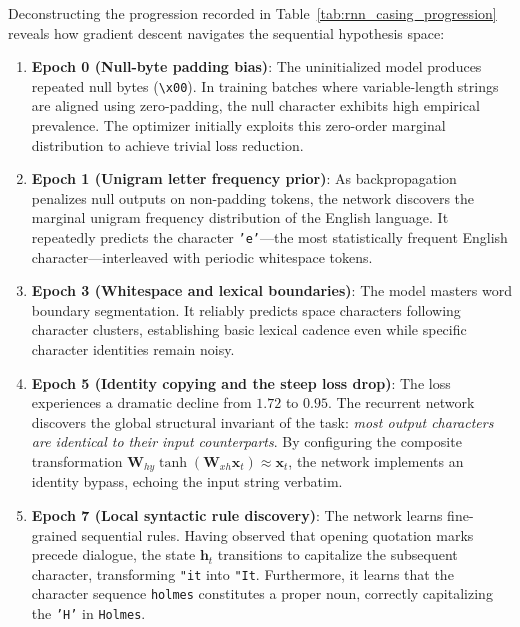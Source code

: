 \documentclass[../../../main.tex]{subfiles}
\begin{document}
Deconstructing the progression recorded in Table~\ref{tab:rnn_casing_progression} reveals how gradient descent navigates the sequential hypothesis space:
\begin{enumerate}
    \item \textbf{Epoch 0 (Null-byte padding bias)}: The uninitialized model produces repeated null bytes (\texttt{\textbackslash x00}). In training batches where variable-length strings are aligned using zero-padding, the null character exhibits high empirical prevalence. The optimizer initially exploits this zero-order marginal distribution to achieve trivial loss reduction.
    \item \textbf{Epoch 1 (Unigram letter frequency prior)}: As backpropagation penalizes null outputs on non-padding tokens, the network discovers the marginal unigram frequency distribution of the English language. It repeatedly predicts the character \texttt{'e'}—the most statistically frequent English character—interleaved with periodic whitespace tokens.
    \item \textbf{Epoch 3 (Whitespace and lexical boundaries)}: The model masters word boundary segmentation. It reliably predicts space characters following character clusters, establishing basic lexical cadence even while specific character identities remain noisy.
    \item \textbf{Epoch 5 (Identity copying and the steep loss drop)}: The loss experiences a dramatic decline from $1.72$ to $0.95$. The recurrent network discovers the global structural invariant of the task: \textit{most output characters are identical to their input counterparts}. By configuring the composite transformation $\mathbf{W}_{hy} \tanh(\mathbf{W}_{xh} \mathbf{x}_t) \approx \mathbf{x}_t$, the network implements an identity bypass, echoing the input string verbatim.
    \item \textbf{Epoch 7 (Local syntactic rule discovery)}: The network learns fine-grained sequential rules. Having observed that opening quotation marks precede dialogue, the state $\mathbf{h}_t$ transitions to capitalize the subsequent character, transforming \texttt{"it} into \texttt{"It}. Furthermore, it learns that the character sequence \texttt{holmes} constitutes a proper noun, correctly capitalizing the \texttt{'H'} in \texttt{Holmes}.
\end{enumerate}
\end{document}
